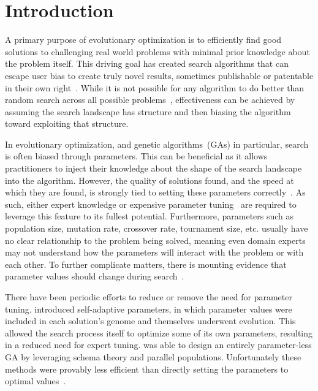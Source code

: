 \chapter{Introduction}
\label{chap-introduction}
A primary purpose of evolutionary optimization is to efficiently find good solutions
to challenging real world problems with minimal prior knowledge about the problem itself.
This driving goal has created search algorithms that can escape user bias to create
truly novel results, sometimes publishable or patentable in their own right~\cite{kannappan:2014:humies}.
While it is not possible for any algorithm to do better than random search across all possible
problems~\cite{Wolpert:1997:nfl}, effectiveness can be achieved by assuming the search
landscape has structure and then biasing the algorithm toward exploiting that structure.

In evolutionary optimization, and genetic algorithms~(GAs) in particular, search is often
biased through parameters. This can be beneficial as it allows practitioners to inject their
knowledge about the shape of the search landscape into the algorithm.
However, the quality of solutions found, and the speed at which they are found, is strongly tied to setting these parameters
correctly~\cite{goldberg:1991:gasize}. As such, either expert
knowledge or 
expensive parameter tuning~\cite{grefenstette:1986:optimalga} are required to leverage
this feature to its fullest potential. Furthermore,  parameters such as population size, mutation rate, crossover
rate, tournament size, etc. usually have no clear relationship to the problem being solved, meaning even
domain experts may not understand how the parameters will interact with the problem or with each other.
To further complicate matters, there is mounting evidence that parameter values should change
during search~\cite{goldman:2011:dynamic-parameters,laporte:2014:adaptivepop}.

There have been periodic efforts to reduce or remove the need for parameter tuning.
\cite{rechenberg:1973:es} introduced self-adaptive parameters, in which parameter values
were included in each solution's genome and themselves underwent
evolution. This allowed 
the search process itself 
to optimize some of its own parameters, resulting in a reduced need for expert tuning.
\cite{harik:1999:parameterlessga} was able to design an entirely parameter-less GA by
leveraging schema theory and parallel populations. Unfortunately these methods were provably less efficient
than directly setting the parameters to optimal values~\cite{pelikan:1999:worstparameter-less}.

